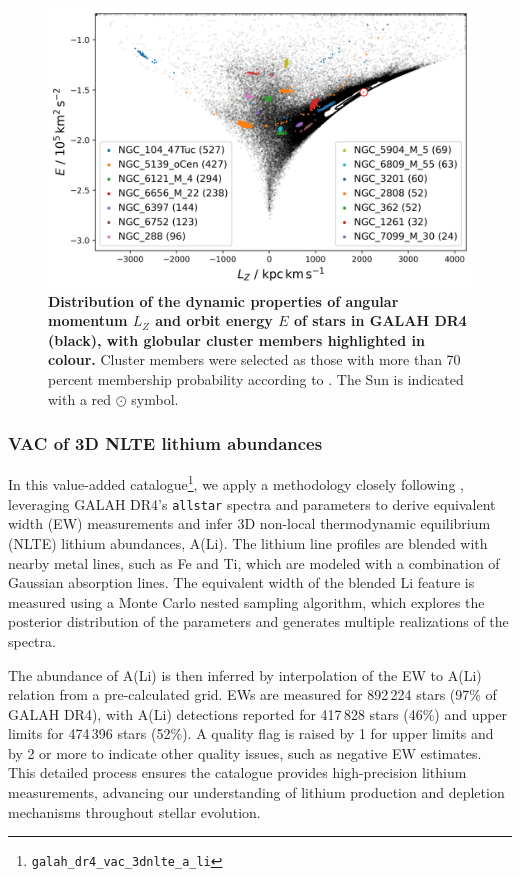 \documentclass[
  journal=pasa,
  manuscript=research-paper, %
  year=2024,
  volume=37
]{cup-journal}
\begin{document}
\begin{figure}[ht]
\includegraphics[width=\columnwidth]{figures/galah_dr4_lz_e_with_gcs.png}
\caption{
\textbf{Distribution of the dynamic properties of angular momentum $L_Z$ and orbit energy $E$ of stars in GALAH DR4 (black), with globular cluster members highlighted in colour.} Cluster members were selected as those with more than 70 percent membership probability according to \citet{Vasiliev2021}. The Sun is indicated with a red $\odot$ symbol.
}
\label{fig:galah_dr4_lz_e_with_gcs}
\end{figure}

\subsubsection{VAC of 3D NLTE lithium abundances}

In this value-added catalogue\footnote{\texttt{galah\_dr4\_vac\_3dnlte\_a\_li}}, we apply a methodology closely following \citet{Wang2024}, leveraging GALAH DR4's \texttt{allstar} spectra and parameters to derive equivalent width (EW) measurements and infer 3D non-local thermodynamic equilibrium (NLTE) lithium abundances, A(Li). The lithium line profiles are blended with nearby metal lines, such as Fe and Ti, which are modeled with a combination of Gaussian absorption lines. The equivalent width of the blended Li feature is measured using a Monte Carlo nested sampling algorithm, which explores the posterior distribution of the parameters and generates multiple realizations of the spectra.

The abundance of A(Li) is then inferred by interpolation of the EW to A(Li) relation from a pre-calculated grid. EWs are measured for 892\,224 stars (97\% of GALAH DR4), with A(Li) detections reported for 417\,828 stars (46\%) and upper limits for 474\,396 stars (52\%). A quality flag is raised by 1 for upper limits and by 2 or more to indicate other quality issues, such as negative EW estimates. This detailed process ensures the catalogue provides high-precision lithium measurements, advancing our understanding of lithium production and depletion mechanisms throughout stellar evolution.
\end{document}
